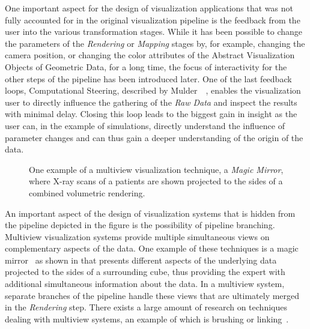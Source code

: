 One important aspect for the design of visualization applications that was not fully accounted for in the original visualization pipeline is the feedback from the user into the various transformation stages.  While it has been possible to change the parameters of the \emph{Rendering} or \emph{Mapping} stages by, for example, changing the camera position, or changing the color attributes of the Abstract Visualization Objects of Geometric Data, for a long time, the focus of interactivity for the other steps of the pipeline has been introduced later.  One of the last feedback loops, Computational Steering, described by Mulder~\etal~\cite{mulder1999survey}, enables the visualization user to directly influence the gathering of the \emph{Raw Data} and inspect the results with minimal delay.  Closing this loop leads to the biggest gain in insight as the user can, in the example of simulations, directly understand the influence of parameter changes and can thus gain a deeper understanding of the origin of the data.

\begin{figure}
  \centering
  \caption{One example of a multiview visualization technique, a \emph{Magic Mirror}, where X-ray scans of a patients are shown projected to the sides of a combined volumetric rendering.}
  \label{fig:intro:mm}
\end{figure}

An important aspect of the design of visualization systems that is hidden from the pipeline depicted in the figure is the possibility of pipeline branching.  Multiview visualization systems provide multiple simultaneous views on complementary aspects of the data.  One example of these techniques is a magic mirror~\cite{konig1999multiple} as shown in  that presents different aspects of the underlying data projected to the sides of a surrounding cube, thus providing the expert with additional simultaneous information about the data.  In a multiview system, separate branches of the pipeline handle these views that are ultimately merged in the \emph{Rendering} step.  There exists a large amount of research on techniques dealing with multiview systems, an example of which is brushing or linking~\cite{tory2003mental}.



